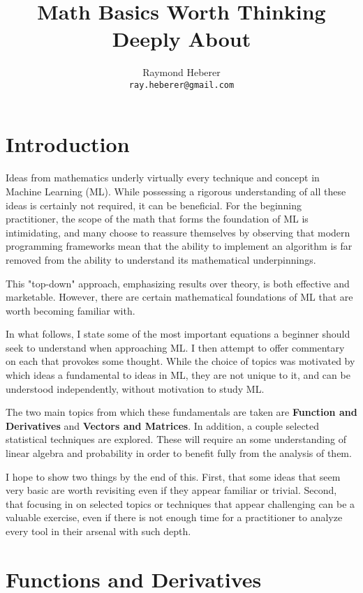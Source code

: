 \documentclass[a4paper]{article}
\title{Math Basics Worth Thinking Deeply About}
\author{Raymond Heberer\\
  \texttt{ray.heberer@gmail.com}}
\begin{document}
\maketitle

\section{Introduction}

\paragraph{} Ideas from mathematics underly virtually every technique and concept in Machine Learning (ML). While possessing a rigorous understanding of all these ideas is certainly not required, it can be beneficial. For the beginning practitioner, the scope of the math that forms the foundation of ML is intimidating, and many choose to reassure themselves by observing that modern programming frameworks mean that the ability to implement an algorithm is far removed from the ability to understand its mathematical underpinnings. 

This "top-down" approach, emphasizing results over theory, is both effective and marketable. However, there are certain mathematical foundations of ML that are worth becoming familiar with.

In what follows, I state some of the most important equations a beginner should seek to understand when approaching ML. I then attempt to offer commentary on each that provokes some thought. While the choice of topics was motivated by which ideas a fundamental to ideas in ML, they are not unique to it, and can be understood independently, without motivation to study ML. 

The two main topics from which these fundamentals are taken are \textbf{Function and Derivatives} and \textbf{Vectors and Matrices}. In addition, a couple selected statistical techniques are explored. These will require an some understanding of linear algebra and probability in order to benefit fully from the analysis of them.

I hope to show two things by the end of this. First, that some ideas that seem very basic are worth revisiting even if they appear familiar or trivial. Second, that focusing in on selected topics or techniques that appear challenging can be a valuable exercise, even if there is not enough time for a practitioner to analyze every tool in their arsenal with such depth.

\section{Functions and Derivatives}
\end{document}
